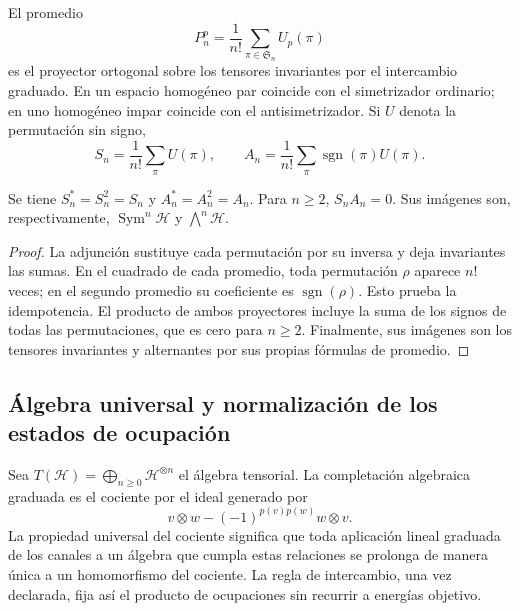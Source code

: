 El promedio
\[
 P_n^p=\frac1{n!}\sum_{\pi\in\mathfrak S_n}U_p(\pi)
\]
es el proyector ortogonal sobre los tensores invariantes por el
intercambio graduado. En un espacio homogéneo par coincide con el
simetrizador ordinario; en uno homogéneo impar coincide con el
antisimetrizador. Si \(U\) denota la permutación sin signo,
\begin{equation}
 S_n=\frac1{n!}\sum_\pi U(\pi),\qquad
 A_n=\frac1{n!}\sum_\pi\operatorname{sgn}(\pi)U(\pi).
 \label{vi:eq:simetrizadores-fock}
\end{equation}

\begin{proposition}
\label{vi:prop:proyectores-fock}
Se tiene \(S_n^*=S_n^2=S_n\) y \(A_n^*=A_n^2=A_n\).
Para \(n\ge2\), \(S_nA_n=0\). Sus imágenes son, respectivamente,
\(\operatorname{Sym}^n\mathcal H\) y \(\bigwedge^n\mathcal H\).
\end{proposition}
\begin{proof}
La adjunción sustituye cada permutación por su inversa y deja
invariantes las sumas. En el cuadrado de cada promedio, toda
permutación \(\rho\) aparece \(n!\) veces; en el segundo promedio
su coeficiente es \(\operatorname{sgn}(\rho)\). Esto prueba
la idempotencia. El producto de ambos proyectores incluye la suma
de los signos de todas las permutaciones, que es cero para
\(n\ge2\). Finalmente, sus imágenes son los tensores invariantes
y alternantes por sus propias fórmulas de promedio.
\end{proof}

\subsection{Álgebra universal y normalización de los estados de ocupación}
\label{vi:subsec:fock-construccion}

Sea \(T(\mathcal H)=\bigoplus_{n\ge0}\mathcal H^{\otimes n}\)
el álgebra tensorial. La completación algebraica graduada es el
cociente por el ideal generado por
\begin{equation}
 v\otimes w-(-1)^{p(v)p(w)}w\otimes v.
 \label{vi:eq:ideal-fock}
\end{equation}
La propiedad universal del cociente significa que toda aplicación
lineal graduada de los canales a un álgebra que cumpla estas
relaciones se prolonga de manera única a un homomorfismo del
cociente. La regla de intercambio, una vez declarada, fija así el
producto de ocupaciones sin recurrir a energías objetivo.

